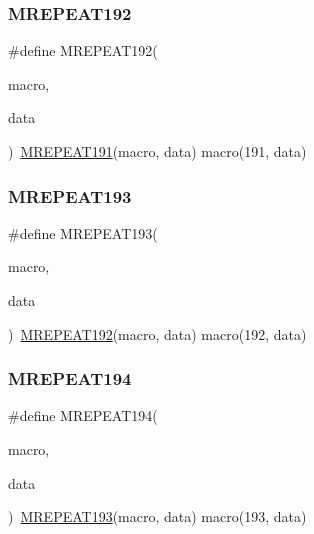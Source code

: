 \mbox{\label{group__group__sam0__utils__mrepeat_ga409d357004e39610efaaad55f3325484}} 
\subsubsection{\texorpdfstring{MREPEAT192}{MREPEAT192}}
{\footnotesize\ttfamily \#define M\+R\+E\+P\+E\+A\+T192(\begin{DoxyParamCaption}\item[{}]{macro,  }\item[{}]{data }\end{DoxyParamCaption})~\mbox{\hyperlink{group__group__sam0__utils__mrepeat_ga8914eac2b15fba3933b8bd800427a153}{M\+R\+E\+P\+E\+A\+T191}}(macro, data)   macro(191, data)}

\mbox{\label{group__group__sam0__utils__mrepeat_ga44cace8e364132f4472cb81dabb2e525}} 
\subsubsection{\texorpdfstring{MREPEAT193}{MREPEAT193}}
{\footnotesize\ttfamily \#define M\+R\+E\+P\+E\+A\+T193(\begin{DoxyParamCaption}\item[{}]{macro,  }\item[{}]{data }\end{DoxyParamCaption})~\mbox{\hyperlink{group__group__sam0__utils__mrepeat_ga409d357004e39610efaaad55f3325484}{M\+R\+E\+P\+E\+A\+T192}}(macro, data)   macro(192, data)}

\mbox{\label{group__group__sam0__utils__mrepeat_gad99185ad8f1a4a6a5597cf80d2ef1453}} 
\subsubsection{\texorpdfstring{MREPEAT194}{MREPEAT194}}
{\footnotesize\ttfamily \#define M\+R\+E\+P\+E\+A\+T194(\begin{DoxyParamCaption}\item[{}]{macro,  }\item[{}]{data }\end{DoxyParamCaption})~\mbox{\hyperlink{group__group__sam0__utils__mrepeat_ga44cace8e364132f4472cb81dabb2e525}{M\+R\+E\+P\+E\+A\+T193}}(macro, data)   macro(193, data)}

